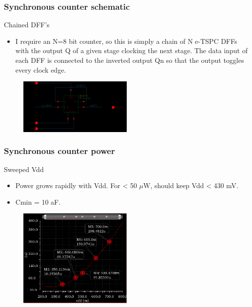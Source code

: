 \documentclass[t, screen, aspectratio=43]{beamer}
\begin{document}
\begin{frame}
	\frametitle{Synchronous counter schematic}
	\begin{block}{Chained DFF's}
	\tiny
	\begin{itemize}[itemsep=4pt,label=\protect---]
		\item I require an N=8 bit counter, so this is simply a chain of N e-TSPC DFFs with the output Q of a given stage clocking the next stage. The data input of each DFF is connected to the inverted output Qn so that the output toggles every clock edge.
	\end{itemize}

	\begin{figure}[htb!]

	        \center\includegraphics[width=0.5\textwidth, angle=0]{sync_counter.png}
	\end{figure}
	\end{block}	
\end{frame}


\begin{frame}
	\frametitle{Synchronous counter power}
	\begin{block}{Sweeped Vdd}
	\tiny
	\begin{itemize}[itemsep=4pt,label=\protect---]
		\item Power grows rapidly with Vdd. For < 50 $\mu$W, should keep Vdd < 430 mV.
		\item Cmin = 10 aF.
	\end{itemize}

	\begin{figure}[htb!]

	        \center\includegraphics[width=0.5\textwidth, angle=0]{count_power.png}
	\end{figure}
	\end{block}	
\end{frame}
\end{document}
